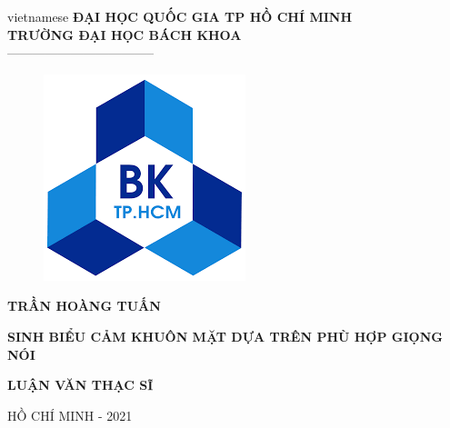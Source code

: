 \begin{titlepage}
\begin{center}

\vspace*{3\bigskipamount}

\begin{otherlanguage*}{vietnamese}
\makeatletter
\fontsize{12}{12}\textbf{ĐẠI HỌC QUỐC GIA TP HỒ CHÍ MINH}\\
\fontsize{14}{14}\textbf{TRƯỜNG ĐẠI HỌC BÁCH KHOA}\\
\fontsize{14}{14} -----------------------------------
\makeatother

\begin{figure}[h]
    \centering
    \includegraphics[width=0.4\columnwidth]{./cover/bk.png}
\end{figure}

{\makeatletter
\fontsize{16}{16}\textbf{TRẦN HOÀNG TUẤN}\\
\makeatother}

\vspace{1.2cm}

{\makeatletter
\fontsize{18}{18}\textbf{SINH BIỂU CẢM KHUÔN MẶT DỰA TRÊN PHÙ HỢP GIỌNG NÓI}\\
\makeatother}

\vspace{1.2cm}
{\makeatletter
\fontsize{18}{18}\textbf{LUẬN VĂN THẠC SĨ}\\
\makeatother}


\vspace{7cm}
{\makeatletter
\fontsize{12}{12} HỒ CHÍ MINH - 2021\\
\makeatother}

\end{otherlanguage*}

\end{center}
\end{titlepage}
    
    
